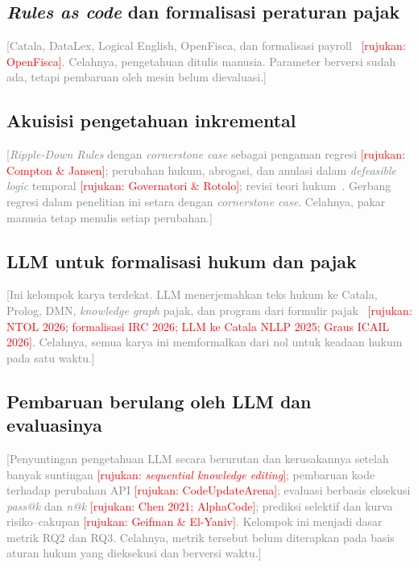 \documentclass[journal,a4paper]{IEEEtran}
\newcommand{\en}[1]{\textit{#1}}
\newif\ifrancangan \rancangantrue
\newcommand{\isian}[1]{\ifrancangan\textcolor{gray}{[#1]}\fi}
\newcommand{\rujuk}[1]{\textcolor{red}{[rujukan: #1]}}
\begin{document}
\subsection{\en{Rules as code} dan formalisasi peraturan pajak}
\isian{Catala, DataLex, Logical English, OpenFisca, dan formalisasi payroll~\cite{merigoux2021catala,mowbray2023scaling,kowalski2022logicalenglish,dumancic2021payroll} \rujuk{OpenFisca}. Celahnya, pengetahuan ditulis manusia. Parameter berversi sudah ada, tetapi pembaruan oleh mesin belum dievaluasi.}

\subsection{Akuisisi pengetahuan inkremental}
\isian{\en{Ripple-Down Rules} dengan \en{cornerstone case} sebagai pengaman regresi \rujuk{Compton \& Jansen}; perubahan hukum, abrogasi, dan anulasi dalam \en{defeasible logic} temporal \rujuk{Governatori \& Rotolo}; revisi teori hukum~\cite{moguillansky2024temporalised,olivieri2025revising}. Gerbang regresi dalam penelitian ini setara dengan \en{cornerstone case}. Celahnya, pakar manusia tetap menulis setiap perubahan.}

\subsection{LLM untuk formalisasi hukum dan pajak}
\isian{Ini kelompok karya terdekat. LLM menerjemahkan teks hukum ke Catala, Prolog, DMN, \en{knowledge graph} pajak, dan program dari formulir pajak~\cite{janatian2023texttostructure,makowski2025dmn} \rujuk{NTOL 2026; formalisasi IRC 2026; LLM ke Catala NLLP 2025; Graus ICAIL 2026}. Celahnya, semua karya ini memformalkan dari nol untuk keadaan hukum pada satu waktu.}

\subsection{Pembaruan berulang oleh LLM dan evaluasinya}
\isian{Penyuntingan pengetahuan LLM secara berurutan dan kerusakannya setelah banyak suntingan \rujuk{\en{sequential knowledge editing}}; pembaruan kode terhadap perubahan API \rujuk{CodeUpdateArena}; evaluasi berbasis eksekusi \en{pass@k} dan \en{n@k} \rujuk{Chen 2021; AlphaCode}; prediksi selektif dan kurva risiko--cakupan \rujuk{Geifman \& El-Yaniv}. Kelompok ini menjadi dasar metrik RQ2 dan RQ3. Celahnya, metrik tersebut belum diterapkan pada basis aturan hukum yang dieksekusi dan berversi waktu.}
\end{document}

